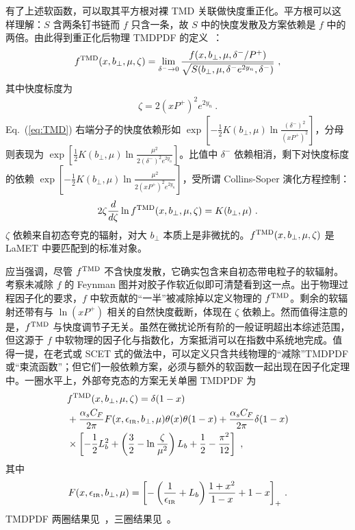 有了上述软函数，可以取其平方根对裸 TMD 关联做快度重正化。平方根可以这样理解：$S$ 含两条钉书链而 $f$ 只含一条，故 $S$ 中的快度发散及方案依赖是 $f$ 中的两倍。由此得到重正化后物理 TMDPDF 的定义~\cite{Echevarria:2012js,Collins:2012uy}：
\begin{align}\label{eq:TMD}
	f^{\rm TMD}(x,b_\perp,\mu,\zeta)=\lim_{\delta^- \rightarrow 0}\frac{f(x,b_\perp,\mu,\delta^-/P^+)}{\sqrt{S(b_\perp,\mu,\delta^- e^{2y_n},\delta^-)}} \ ,
\end{align}
其中快度标度为
\begin{align} \label{zeta}
	\zeta=2(xP^+)^2 e^{2y_n} \ .
\end{align}
Eq.~(\ref{eq:TMD}) 右端分子的快度依赖形如 $\exp[-\frac{1}{2}K(b_\perp,\mu)\ln \frac{(\delta^-)^2}{(xP^+)^2}]$，分母则表现为 $\exp[\frac{1}{2}K(b_\perp,\mu)\ln \frac{\mu^2}{2(\delta^-)^2e^{2y_n}}]$。比值中 $\delta^-$ 依赖相消，剩下对快度标度的依赖 $\exp[-\frac{1}{2}K(b_\perp,\mu)\ln \frac{\mu^2}{2(xP^+)^2e^{2y_n}}]$，受所谓 Collins-Soper 演化方程控制：
\begin{align}\label{eq:cs}
	2\zeta \frac{d}{d\zeta} \ln  f^{\rm TMD}(x,b_\perp,\mu,\zeta)=K(b_\perp,\mu) \ .
\end{align}
$\zeta$ 依赖来自初态夸克的辐射，对大 $b_\perp$ 本质上是非微扰的。$f^{\rm TMD}(x,b_\perp,\mu,\zeta)$ 是 LaMET 中要匹配到的标准对象。

应当强调，尽管 $f^{\rm TMD}$ 不含快度发散，它确实包含来自初态带电粒子的软辐射。考察未减除 $f$ 的 Feynman 图并对胶子作软近似即可清楚看到这一点。出于物理过程因子化的要求，$f$ 中软贡献的``一半''被减除掉以定义物理的 $f^{\rm TMD}$。剩余的软辐射还带有与 $\ln(xP^+)$ 相关的自然快度截断，体现在 $\zeta$ 依赖上。然而值得注意的是，$f^{\rm TMD}$ 与快度调节子无关。虽然在微扰论所有阶的一般证明超出本综述范围，但这源于 $f$ 中软物理的因子化与指数化，方案抵消可以在指数中系统地完成。值得一提，在老式或 SCET 式的做法中，可以定义只含共线物理的``减除''TMDPDF 或``束流函数''；但它们一般依赖方案，必须与额外的软函数一起出现在因子化定理中。一圈水平上，外部夸克态的方案无关单圈 TMDPDF 为
\begin{align}\label{eq:ftmd_1loop}
	&f^{\rm TMD}(x,b_\perp,\mu,\zeta) = \delta(1-x)\nonumber \\
	&+\frac{\alpha_sC_F}{2\pi}F(x,\epsilon_{\tiny\mbox{IR}},b_\perp,\mu)\theta(x)\theta(1-x)+\frac{\alpha_sC_F}{2\pi}\delta(1-x)\nonumber \\
	&\times \left[-\frac{1}{2}L_b^2+\left(\frac{3}{2}-\ln \frac{\zeta}{\mu^2}\right)L_b+\frac{1}{2}-\frac{\pi^2}{12}\right] \ ,
\end{align}
其中
\begin{align}
	F(x,\epsilon_{\tiny\mbox{IR}},b_\perp,\mu)=\left[-\left(\frac{1}{\epsilon_{\tiny\mbox{IR}}}+L_b\right)\frac{1+x^2}{1-x}+1-x\right]_+\,.
\end{align}
TMDPDF 两圈结果见~\cite{Catani:2011kr,Catani:2012qa,Gehrmann:2014yya,Luebbert:2016itl,Echevarria:2016scs,Luo:2019hmp}，三圈结果见~\cite{Luo:2019szz}。

